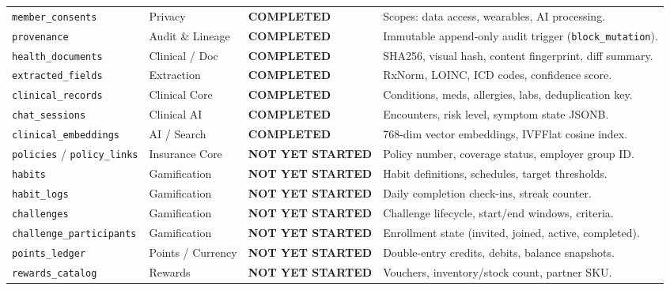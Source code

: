 \documentclass[11pt,a4paper]{article}
\begin{document}
\begin{longtable}{p{4.5cm} p{3.2cm} p{3.2cm} p{3.8cm}}
    \texttt{member\_consents} & Privacy & \textcolor{statuscompleted}{\textbf{COMPLETED}} & Scopes: data access, wearables, AI processing. \\
    \texttt{provenance} & Audit \& Lineage & \textcolor{statuscompleted}{\textbf{COMPLETED}} & Immutable append-only audit trigger (\texttt{block\_mutation}). \\
    \texttt{health\_documents} & Clinical / Doc & \textcolor{statuscompleted}{\textbf{COMPLETED}} & SHA256, visual hash, content fingerprint, diff summary. \\
    \texttt{extracted\_fields} & Extraction & \textcolor{statuscompleted}{\textbf{COMPLETED}} & RxNorm, LOINC, ICD codes, confidence score. \\
    \texttt{clinical\_records} & Clinical Core & \textcolor{statuscompleted}{\textbf{COMPLETED}} & Conditions, meds, allergies, labs, deduplication key. \\
    \texttt{chat\_sessions} & Clinical AI & \textcolor{statuscompleted}{\textbf{COMPLETED}} & Encounters, risk level, symptom state JSONB. \\
    \texttt{clinical\_embeddings} & AI / Search & \textcolor{statuscompleted}{\textbf{COMPLETED}} & 768-dim vector embeddings, IVFFlat cosine index. \\
    \midrule
    \texttt{policies} / \texttt{policy\_links} & Insurance Core & \textcolor{statusnotstarted}{\textbf{NOT YET STARTED}} & Policy number, coverage status, employer group ID. \\
    \texttt{habits} & Gamification & \textcolor{statusnotstarted}{\textbf{NOT YET STARTED}} & Habit definitions, schedules, target thresholds. \\
    \texttt{habit\_logs} & Gamification & \textcolor{statusnotstarted}{\textbf{NOT YET STARTED}} & Daily completion check-ins, streak counter. \\
    \texttt{challenges} & Gamification & \textcolor{statusnotstarted}{\textbf{NOT YET STARTED}} & Challenge lifecycle, start/end windows, criteria. \\
    \texttt{challenge\_participants} & Gamification & \textcolor{statusnotstarted}{\textbf{NOT YET STARTED}} & Enrollment state (invited, joined, active, completed). \\
    \texttt{points\_ledger} & Points / Currency & \textcolor{statusnotstarted}{\textbf{NOT YET STARTED}} & Double-entry credits, debits, balance snapshots. \\
    \texttt{rewards\_catalog} & Rewards & \textcolor{statusnotstarted}{\textbf{NOT YET STARTED}} & Vouchers, inventory/stock count, partner SKU. \\

\end{longtable}
\end{document}
